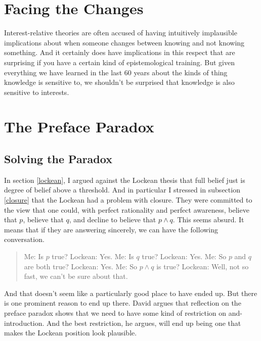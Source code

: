 \documentclass[11pt,]{book}
\begin{document}
\hypertarget{changesobjection}{%
\chapter{Facing the Changes}\label{changesobjection}}

Interest-relative theories are often accused of having intuitively implausible implications about when someone changes between knowing and not knowing something. And it certainly does have implications in this respect that are surprising if you have a certain kind of epistemological training. But given everything we have learned in the last 60 years about the kinds of thing knowledge is sensitive to, we shouldn't be surprised that knowledge is also sensitive to interests.

\hypertarget{preface}{%
\chapter{The Preface Paradox}\label{preface}}

\hypertarget{solving-the-paradox}{%
\section{Solving the Paradox}\label{solving-the-paradox}}

In section \ref{lockean}, I argued against the Lockean thesis that full belief just is degree of belief above a threshold. And in particular I stressed in subsection \ref{closure} that the Lockean had a problem with closure. They were committed to the view that one could, with perfect rationality and perfect awareness, believe that \(p\), believe that \(q\), and decline to believe that \(p \wedge q\). This seems absurd. It means that if they are answering sincerely, we can have the following conversation.

\begin{quote}
Me: Is \(p\) true?
Lockean: Yes.
Me: Is \(q\) true?
Lockean: Yes.
Me: So \(p\) and \(q\) are both true?
Lockean: Yes.
Me: So \(p \wedge q\) is true?
Lockean: Well, not so fast, we can't be sure about that.
\end{quote}

And that doesn't seem like a particularly good place to have ended up. But there is one prominent reason to end up there. David \citet{Christensen2005} argues that reflection on the preface paradox shows that we need to have some kind of restriction on and-introduction. And the best restriction, he argues, will end up being one that makes the Lockean position look plausible.
\end{document}
